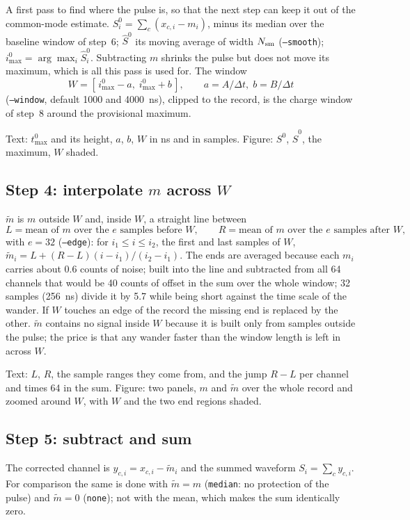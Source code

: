 \documentclass[11pt]{article}
\newcommand{\code}[1]{\texttt{#1}}
\begin{document}
A first pass to find where the pulse is, so that the next step can keep it
out of the common-mode estimate. $S^0_i = \sum_c (x_{c,i} - m_i)$, minus
its median over the baseline window of step~6; $\hat S^0$ its moving
average of width $N_{\rm sm}$ (\code{--smooth}); $i^0_{\max} = \arg\max_i
\hat S^0_i$. Subtracting $m$ shrinks the pulse but does not move its
maximum, which is all this pass is used for. The window
\[
  W = [\,i^0_{\max} - a,\; i^0_{\max} + b\,], \qquad a = A/\Delta t,\; b = B/\Delta t
\]
(\code{--window}, default 1000 and 4000~ns), clipped to the record, is the
charge window of step~8 around the provisional maximum.

Text: $t^0_{\max}$ and its height, $a$, $b$, $W$ in ns and in samples.
Figure: $S^0$, $\hat S^0$, the maximum, $W$ shaded.

\subsection{Step 4: interpolate $m$ across $W$}

$\tilde m$ is $m$ outside $W$ and, inside $W$, a straight line between
\[
  L = \text{mean of } m \text{ over the } e \text{ samples before } W, \qquad
  R = \text{mean of } m \text{ over the } e \text{ samples after } W,
\]
with $e = 32$ (\code{--edge}): for $i_1 \le i \le i_2$, the first and
last samples of $W$, $\tilde m_i = L + (R - L)(i - i_1)/(i_2 - i_1)$. The
ends are averaged because each $m_i$ carries about 0.6 counts of noise;
built into the line and subtracted from all 64 channels that would be
40 counts of offset in the sum over the whole window; 32 samples (256~ns)
divide it by 5.7 while being short against the time scale of the wander.
If $W$ touches an edge of the record the missing end is replaced by the
other. $\tilde m$ contains no signal inside $W$ because it is built only
from samples outside the pulse; the price is that any wander faster than
the window length is left in across $W$.

Text: $L$, $R$, the sample ranges they come from, and the jump $R - L$ per
channel and times 64 in the sum. Figure: two panels, $m$ and $\tilde m$
over the whole record and zoomed around $W$, with $W$ and the two end
regions shaded.

\subsection{Step 5: subtract and sum}

The corrected channel is $y_{c,i} = x_{c,i} - \tilde m_i$ and the summed
waveform $S_i = \sum_c y_{c,i}$. For comparison the same is done with
$\tilde m = m$ (\code{median}: no protection of the pulse) and $\tilde m =
0$ (\code{none}); not with the mean, which makes the sum identically
zero.
\end{document}
